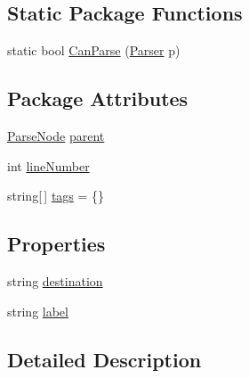\subsection*{Static Package Functions}
\begin{DoxyCompactItemize}
\item 
static bool \hyperlink{a00118_a1ffeca22df52451120cb362f90fd4e9f}{Can\-Parse} (\hyperlink{a00121}{Parser} p)
\end{DoxyCompactItemize}
\subsection*{Package Attributes}
\begin{DoxyCompactItemize}
\item 
\hyperlink{a00120}{Parse\-Node} \hyperlink{a00120_af313a82103fcc2ff5a177dbb06b92f7b}{parent}
\item 
int \hyperlink{a00120_a18b493382de0fde5b4299c1bd2250075}{line\-Number}
\item 
string\mbox{[}$\,$\mbox{]} \hyperlink{a00120_a58b3a15788fd2d4127d73619dc6d04ae}{tags} = \{\}
\end{DoxyCompactItemize}
\subsection*{Properties}
\begin{DoxyCompactItemize}
\item 
string \hyperlink{a00118_abbe56fba06169901508e6c659f06c236}{destination}
\item 
string \hyperlink{a00118_a7f27d78e67fed6992767e995e70fc468}{label}
\end{DoxyCompactItemize}


\subsection{Detailed Description}


